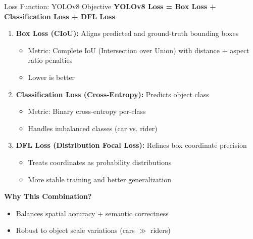 \documentclass{beamer}
\begin{document}
\begin{frame}{Loss Function: YOLOv8 Objective}
    \textbf{YOLOv8 Loss = Box Loss + Classification Loss + DFL Loss}
    
    \vspace{0.3cm}
    \begin{enumerate}
        \item \textbf{Box Loss (CIoU):} Aligns predicted and ground-truth bounding boxes
        \begin{itemize}
            \item Metric: Complete IoU (Intersection over Union) with distance + aspect ratio penalties
            \item Lower is better
        \end{itemize}

        \item \textbf{Classification Loss (Cross-Entropy):} Predicts object class
        \begin{itemize}
            \item Metric: Binary cross-entropy per-class
            \item Handles imbalanced classes (car vs. rider)
        \end{itemize}

        \item \textbf{DFL Loss (Distribution Focal Loss):} Refines box coordinate precision
        \begin{itemize}
            \item Treats coordinates as probability distributions
            \item More stable training and better generalization
        \end{itemize}
    \end{enumerate}

    \vspace{0.3cm}
    \textbf{Why This Combination?}
    \begin{itemize}
        \item Balances spatial accuracy + semantic correctness
        \item Robust to object scale variations (cars $\gg$ riders)
    \end{itemize}
\end{frame}
\end{document}
